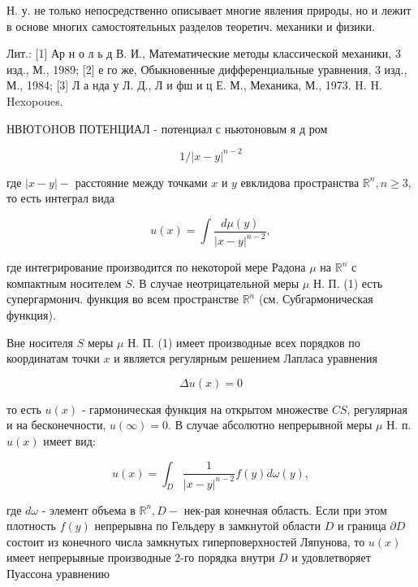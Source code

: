 \documentclass[10pt]{article}
\begin{document}
Н. у. не только непосредственно описывает многие явления природы, но и лежит в основе многих самостоятельных разделов теоретич. механики и физики.



Лит.: [1] Ар н о л ь д В. И., Математические методы классической механики, 3 изд., М., 1989; [2] е го же, Обыкновенные дифференциальные уравнения, 3 изд., М., 1984; [3] Л а нда у Л. Д., Л и фш и ц Е. М., Механика, М., 1973. H. H. Hexopoues.



НВЮTOHОВ ПОТЕНЦИАЛ - потенциал с ньютоновым я д ром



\[

1 /|x-y|^{n-2}

\]



где $|x-y|-$ расстояние между точками $x$ и $y$ евклидова пространства $\mathbb{R}^{n}, n \geqslant 3$, то есть интеграл вида



\[

u(x)=\int \frac{d \mu(y)}{|x-y|^{n-2}},

\]



где интегрирование производится по некоторой мере Радона $\mu$ на $\mathbb{R}^{n}$ с компактным носителем $S$. В случае неотрицательной меры $\mu$ Н. П. (1) есть супергармонич. функция во всем пространстве $\mathbb{R}^{n}$ (см. Субгармоническая функция).



Вне носителя $S$ меры $\mu$ Н. П. (1) имеет производные всех порядков по координатам точки $x$ и является регулярным решением Лапласа уравнения



\[

\Delta u(x)=0

\]



то есть $u(x)$ - гармоническая функция на открытом множестве $C S$, регулярная и на бесконечности, $u(\infty)=0$. В случае абсолютно непрерывной меры $\mu$ Н. п. $u(x)$ имеет вид:



\[

u(x)=\int_{D} \frac{1}{|x-y|^{n-2}} f(y) d \omega(y),

\]



где $d \omega$ - элемент объема в $\mathbb{R}^{n}, D-$ нек-рая конечная область. Если при этом плотность $f(y)$ непрерывна по Гельдеру в замкнутой области $D$ и граница $\partial D$ состоит из конечного числа замкнутых гиперповерхностей Ляпунова, то $u(x)$ имеет непрерывные производные 2-го порядка внутри $D$ и удовлетворяет Пуассона уравнению
\end{document}
